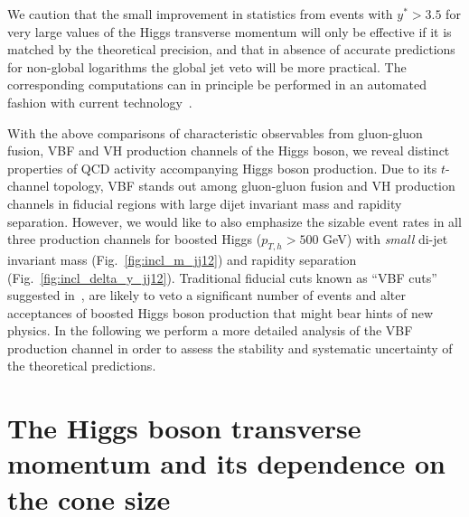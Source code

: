 \documentclass[10pt,prd,fleqn,superscriptaddress,notitlepage,nofootinbib,preprintnumbers,nobalancelastpage]{revtex4-1}
\begin{document}
We caution that the small improvement in statistics from events with $y^* >3.5$ for very large values of the Higgs transverse momentum will only be effective if it is matched by the theoretical precision, and that in absence of accurate predictions for non-global logarithms the global jet veto will be more practical. The corresponding computations can in principle be performed in an automated fashion with current technology~\cite{Gerwick:2014gya,Baberuxki:2019ifp,Baron:2020xoi,Caletti:2021oor}.

With the above comparisons of characteristic observables from gluon-gluon fusion, VBF and VH production channels of the Higgs boson, we reveal distinct properties of QCD activity accompanying Higgs boson production. Due to its $t$-channel topology, VBF stands out among gluon-gluon fusion and VH production channels in fiducial regions with large dijet invariant mass and rapidity separation. However, we would like to also emphasize the sizable event rates in all three production channels for boosted Higgs ($p_{T,h}>500$ GeV) with \emph{small} di-jet invariant mass (Fig.~\ref{fig:incl_m_jj12}) and rapidity separation (Fig.~\ref{fig:incl_delta_y_jj12}). Traditional fiducial cuts known as ``VBF cuts'' suggested in~\cite{Figy:2004pt,Ciccolini:2007ec,deFlorian:2016spz}, are likely to veto a significant number of events and alter acceptances of boosted Higgs boson production that might bear hints of new physics. In the following we perform a more detailed analysis of the VBF production channel in order to assess the stability and systematic uncertainty of the theoretical predictions.

\section{The Higgs boson transverse momentum and its dependence on the cone size}
\label{sec:conesize}
\end{document}
